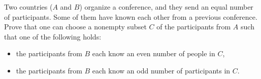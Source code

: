Two countries ($A$ and $B$) organize a conference, and they send an equal number of participants. Some of them have known each other from a previous conference. Prove that one can choose a nonempty subset $C$ of the participants from $A$ such that one of the following holds:
\begin{itemize}
	\item the participants from $B$ each know an even number of people in $C$,
	\item the participants from $B$ each know an odd number of participants in $C$.
\end{itemize}
